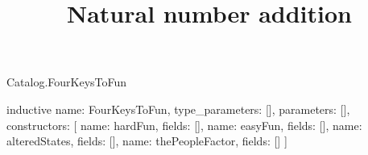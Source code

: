 \begin{lexlean}{Catalog.FourKeysToFun}
\title{Natural number addition}
\begin{semanticmodule}
inductive{
  name: FourKeysToFun,
  type_parameters: [],
  parameters: [],
  constructors: [
    {name: hardFun, fields: []},
    {name: easyFun, fields: []},
    {name: alteredStates, fields: []},
    {name: thePeopleFactor, fields: []}
  ]
}
\end{semanticmodule}
\end{lexlean}
